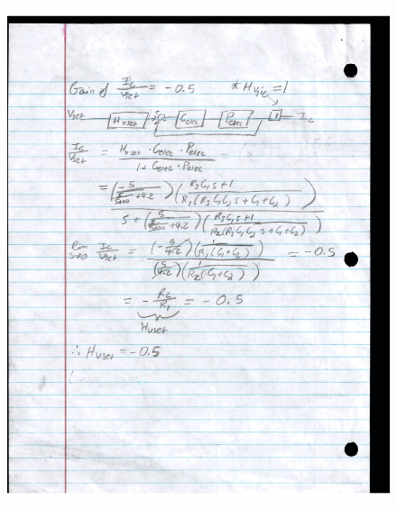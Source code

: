 \documentclass[a4paper, titlepage, 12pt]{article}
\begin{document}
\begin{enumerate}
\begin{figure}[H]
				\includegraphics[width=\linewidth]{images/c_elec_3.jpg}
			\end{figure}
			\begin{figure}[H]
				\centering

\end{figure}
\end{enumerate}
\end{document}
